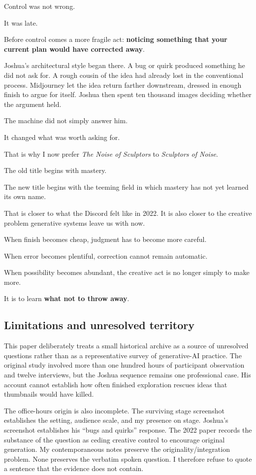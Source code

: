 \documentclass[
]{article}
\begin{document}
Control was not wrong.

It was late.

Before control comes a more fragile act: \textbf{noticing something that
your current plan would have corrected away}.

Joshua's architectural style began there. A bug or quirk produced
something he did not ask for. A rough cousin of the idea had already
lost in the conventional process. Midjourney let the idea return farther
downstream, dressed in enough finish to argue for itself. Joshua then
spent ten thousand images deciding whether the argument held.

The machine did not simply answer him.

It changed what was worth asking for.

That is why I now prefer \emph{The Noise of Sculptors} to
\emph{Sculptors of Noise}.

The old title begins with mastery.

The new title begins with the teeming field in which mastery has not yet
learned its own name.

That is closer to what the Discord felt like in 2022. It is also closer
to the creative problem generative systems leave us with now.

When finish becomes cheap, judgment has to become more careful.

When error becomes plentiful, correction cannot remain automatic.

When possibility becomes abundant, the creative act is no longer simply
to make more.

It is to learn \textbf{what not to throw away}.

\subsection{Limitations and unresolved
territory}\label{limitations-and-unresolved-territory}

This paper deliberately treats a small historical archive as a source of
unresolved questions rather than as a representative survey of
generative-AI practice. The original study involved more than one
hundred hours of participant observation and twelve interviews, but the
Joshua sequence remains one professional case. His account cannot
establish how often finished exploration rescues ideas that thumbnails
would have killed.

The office-hours origin is also incomplete. The surviving stage
screenshot establishes the setting, audience scale, and my presence on
stage. Joshua's screenshot establishes his ``bugs and quirks'' response.
The 2022 paper records the substance of the question as ceding creative
control to encourage original generation. My contemporaneous notes
preserve the originality/integration problem. None preserves the
verbatim spoken question. I therefore refuse to quote a sentence that
the evidence does not contain.
\end{document}
